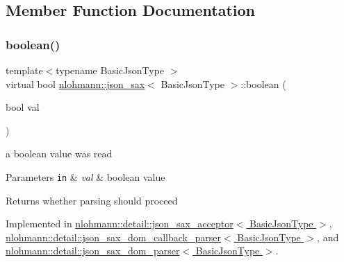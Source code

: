 \subsection{Member Function Documentation}
\mbox{\label{structnlohmann_1_1json__sax_a82ed080814fa656191a537284bb0c575}} 
\subsubsection{\texorpdfstring{boolean()}{boolean()}}
{\footnotesize\ttfamily template$<$typename Basic\+Json\+Type $>$ \\
virtual bool \hyperlink{structnlohmann_1_1json__sax}{nlohmann\+::json\+\_\+sax}$<$ Basic\+Json\+Type $>$\+::boolean (\begin{DoxyParamCaption}\item[{bool}]{val }\end{DoxyParamCaption})\hspace{0.3cm}{\ttfamily [pure virtual]}}



a boolean value was read 


\begin{DoxyParams}[1]{Parameters}
\mbox{\tt in}  & {\em val} & boolean value \\
\hline
\end{DoxyParams}
\begin{DoxyReturn}{Returns}
whether parsing should proceed 
\end{DoxyReturn}


Implemented in \hyperlink{classnlohmann_1_1detail_1_1json__sax__acceptor_ac629bf4f75f489f101d9cd08ffb21d90}{nlohmann\+::detail\+::json\+\_\+sax\+\_\+acceptor$<$ Basic\+Json\+Type $>$}, \hyperlink{classnlohmann_1_1detail_1_1json__sax__dom__callback__parser_a945cb4ac399dad288ad31a67f26590a2}{nlohmann\+::detail\+::json\+\_\+sax\+\_\+dom\+\_\+callback\+\_\+parser$<$ Basic\+Json\+Type $>$}, and \hyperlink{classnlohmann_1_1detail_1_1json__sax__dom__parser_a8746e803df6c21cde68662bc707aba84}{nlohmann\+::detail\+::json\+\_\+sax\+\_\+dom\+\_\+parser$<$ Basic\+Json\+Type $>$}.

\mbox{\label{structnlohmann_1_1json__sax_a235ee975617f28e6a996d1e36a282312}} 
